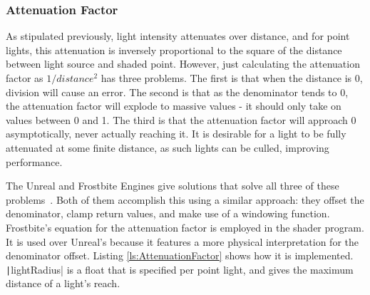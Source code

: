 
\subsubsection{Attenuation Factor}

As stipulated previously, light intensity attenuates over distance, and for point lights, this attenuation is inversely proportional to the square of the distance between light source and shaded point. However, just calculating the attenuation factor as \begin{math}1 / distance^2\end{math} has three problems. The first is that when the distance is 0, division will cause an error. The second is that as the denominator tends to 0, the attenuation factor will explode to massive values - it should only take on values between 0 and 1. The third is that the attenuation factor will approach 0 asymptotically, never actually reaching it. It is desirable for a light to be fully attenuated at some finite distance, as such lights can be culled, improving performance.

The Unreal and Frostbite Engines give solutions that solve all three of these problems~\cite{RealShadingInUnreal}\cite{MovingFrostbitetoPBR}. Both of them accomplish this using a similar approach: they offset the denominator, clamp return values, and make use of a windowing function. Frostbite's equation for the attenuation factor is employed in the shader program. It is used over Unreal's because it features a more physical interpretation for the denominator offset. Listing \ref{ls:AttenuationFactor} shows how it is implemented. \texttt|lightRadius| is a float that is specified per point light, and gives the maximum distance of a light's reach.

